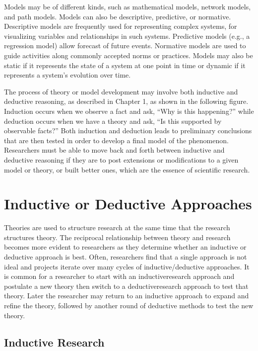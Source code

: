 Models may be of different kinds, such as mathematical models, network models, and path models. Models can also be descriptive, predictive, or normative. Descriptive models are frequently used for representing complex systems, for visualizing variables and relationships in such systems. Predictive models (e.g., a regression model) allow forecast of future events. Normative models are used to guide activities along commonly accepted norms or practices. Models may also be static if it represents the state of a system at one point in time or dynamic if it represents a system's evolution over time.

The process of theory or model development may involve both inductive and deductive reasoning, as described in Chapter 1, as shown in the following figure. Induction occurs when we observe a fact and ask, ``Why is this happening?'' while deduction occurs when we have a theory and ask, ``Is this supported by observable facts?'' Both induction and deduction leads to preliminary conclusions that are then tested in order to develop a final model of the phenomenon. Researchers must be able to move back and forth between inductive and deductive reasoning if they are to post extensions or modifications to a given model or theory, or built better ones, which are the essence of scientific research.


\section{Inductive or Deductive Approaches}

Theories are used to structure research at the same time that the research structures theory. The reciprocal relationship between theory and research becomes more evident to researchers as they determine whether an inductive or deductive approach is best. Often, researchers find that a single approach is not ideal and projects iterate over many cycles of inductive/deductive approaches. It is common for a researcher to start with an \gls{inductiveresearch} approach and postulate a new theory then switch to a \gls{deductiveresearch} approach to test that theory. Later the researcher may return to an inductive approach to expand and refine the theory, followed by another round of deductive methods to test the new theory.

\subsection{Inductive Research}

